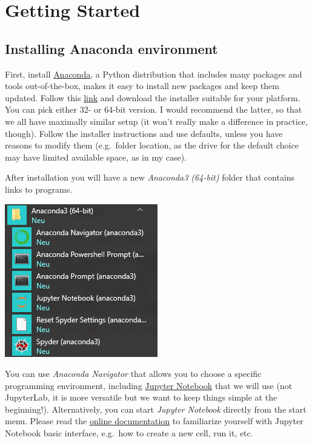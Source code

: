 \documentclass[
]{book}
\begin{document}
\hypertarget{getting-started}{%
\chapter*{Getting Started}\label{getting-started}}

\hypertarget{install-anaconda}{%
\section*{Installing Anaconda environment}\label{install-anaconda}}

First, install \href{https://www.anaconda.com}{Anaconda}, a Python distribution that includes many packages and tools out-of-the-box, makes it easy to install new packages and keep them updated. Follow this \href{https://www.anaconda.com/products/individual}{link} and download the installer suitable for your platform. You can pick either 32- or 64-bit version. I would recommend the latter, so that we all have maximally similar setup (it won't really make a difference in practice, though). Follow the installer instructions and use defaults, unless you have reasons to modify them (e.g.~folder location, as the drive for the default choice may have limited available space, as in my case).

After installation you will have a new \emph{Anaconda3 (64-bit)} folder that contains links to programs.

\begin{center}\includegraphics[width=0.5\linewidth]{images/anaconda-shortcuts} \end{center}

You can use \emph{Anaconda Navigator} that allows you to choose a specific programming environment, including \href{https://jupyter.org/}{Jupyter Notebook} that we will use (not JupyterLab, it is more versatile but we want to keep things simple at the beginning!). Alternatively, you can start \emph{Jupyter Notebook} directly from the start menu. Please read the \href{https://jupyter-notebook.readthedocs.io/en/stable/examples/Notebook/examples_index.html}{online documentation} to familiarize yourself with Jupyter Notebook basic interface, e.g.~how to create a new cell, run it, etc.
\end{document}
